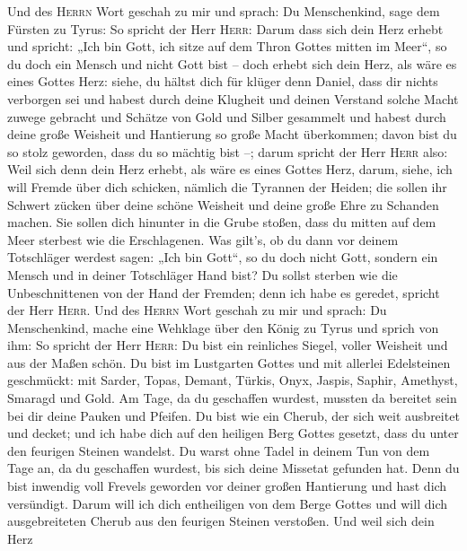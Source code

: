  Und des \textsc{Herrn} Wort geschah zu mir und sprach:
 Du Menschenkind, sage dem Fürsten zu Tyrus: So spricht
der Herr \textsc{Herr}: Darum dass sich dein Herz erhebt und spricht:
„Ich bin Gott, ich sitze auf dem Thron Gottes mitten im Meer``, so du
doch ein Mensch und nicht Gott bist -- doch erhebt sich dein Herz, als
wäre es eines Gottes Herz:  siehe, du hältst dich für
klüger denn Daniel, dass dir nichts verborgen sei  und
habest durch deine Klugheit und deinen Verstand solche Macht zuwege
gebracht und Schätze von Gold und Silber gesammelt  und
habest durch deine große Weisheit und Hantierung so große Macht
überkommen; davon bist du so stolz geworden, dass du so mächtig bist --;
 darum spricht der Herr \textsc{Herr} also: Weil sich denn
dein Herz erhebt, als wäre es eines Gottes Herz,  darum,
siehe, ich will Fremde über dich schicken, nämlich die Tyrannen der
Heiden; die sollen ihr Schwert zücken über deine schöne Weisheit und
deine große Ehre zu Schanden machen.  Sie sollen dich
hinunter in die Grube stoßen, dass du mitten auf dem Meer sterbest wie
die Erschlagenen.  Was gilt's, ob du dann vor deinem
Totschläger werdest sagen: „Ich bin Gott``, so du doch nicht Gott,
sondern ein Mensch und in deiner Totschläger Hand bist? 
Du sollst sterben wie die Unbeschnittenen von der Hand der Fremden; denn
ich habe es geredet, spricht der Herr \textsc{Herr}.  Und
des \textsc{Herrn} Wort geschah zu mir und sprach:  Du
Menschenkind, mache eine Wehklage über den König zu Tyrus und sprich von
ihm: So spricht der Herr \textsc{Herr}: Du bist ein reinliches Siegel,
voller Weisheit und aus der Maßen schön.  Du bist im
Lustgarten Gottes und mit allerlei Edelsteinen geschmückt: mit Sarder,
Topas, Demant, Türkis, Onyx, Jaspis, Saphir, Amethyst, Smaragd und Gold.
Am Tage, da du geschaffen wurdest, mussten da bereitet sein bei dir
deine Pauken und Pfeifen.  Du bist wie ein Cherub, der
sich weit ausbreitet und decket; und ich habe dich auf den heiligen Berg
Gottes gesetzt, dass du unter den feurigen Steinen wandelst.
 Du warst ohne Tadel in deinem Tun von dem Tage an, da du
geschaffen wurdest, bis sich deine Missetat gefunden hat.
 Denn du bist inwendig voll Frevels geworden vor deiner
großen Hantierung und hast dich versündigt. Darum will ich dich
entheiligen von dem Berge Gottes und will dich ausgebreiteten Cherub aus
den feurigen Steinen verstoßen.  Und weil sich dein Herz

